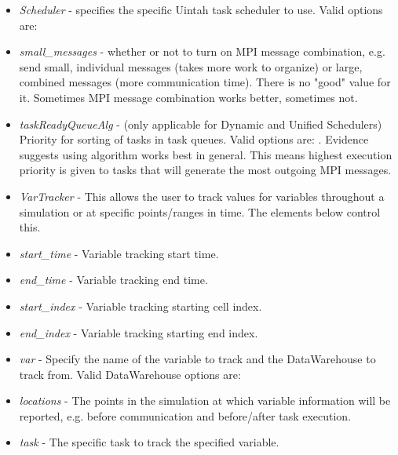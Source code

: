 \begin{itemize}
  \item \emph{Scheduler} - specifies the specific Uintah task scheduler to
      use.
      Valid options are: 
  \item \emph{small\_messages} - whether or not to turn on MPI message
      combination, e.g. send small, individual messages (takes more work to
      organize) or large, combined messages (more communication time). There
      is no "good" value for it. Sometimes MPI message combination works
      better, sometimes not.
  \item \emph{taskReadyQueueAlg} - (only applicable for Dynamic and Unified
      Schedulers) Priority for sorting of tasks in task queues. Valid
      options are: . Evidence suggests using  algorithm works 
      best in general. This means highest execution priority is given to 
      tasks that will generate the most outgoing MPI messages.
  \item \emph{VarTracker} - This allows the user to track values for
      variables throughout a simulation or at specific points/ranges in
      time. The elements below control this.
  \vspace{-5pt}
  \item \emph{start\_time} - Variable tracking start time.
  \vspace{-5pt}
  \item \emph{end\_time} - Variable tracking end time.
  \vspace{-5pt}
  \item \emph{start\_index} - Variable tracking starting cell index.
  \vspace{-5pt}
  \item \emph{end\_index} - Variable tracking starting end index.
  \vspace{-5pt}
  \item \emph{var} - Specify the name of the variable to track and the
      DataWarehouse to track from. Valid DataWarehouse options are:
  \vspace{-5pt}
  \item \emph{locations} - The points in the simulation at which variable
      information will be reported, e.g. before communication and
      before/after task execution.
  \vspace{-5pt}
  \item \emph{task} - The specific task to track the specified variable.
\end{itemize}

